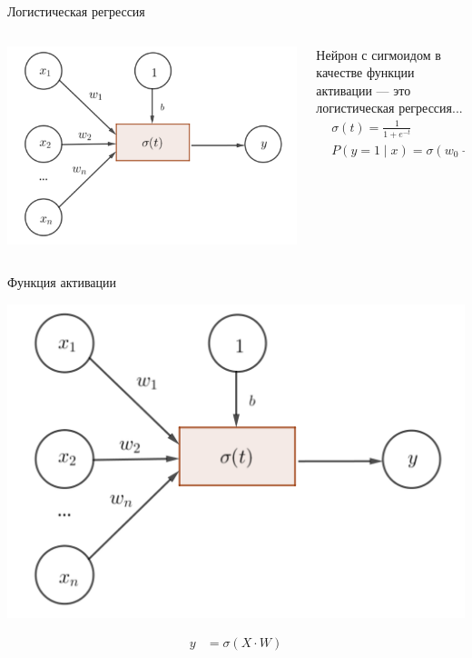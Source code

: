 \documentclass[notes,12pt, aspectratio=169]{beamer}
\begin{document}
\begin{frame}{Логистическая регрессия}
\begin{columns}[T] 
	\begin{column}{.45\textwidth}
		\begin{center}
			\includegraphics[width=0.99\linewidth]{neuron_3.png}
		\end{center}
	\end{column}%
	\hfill%
	\begin{column}{.55\textwidth}
%		
		
		Нейрон с сигмоидом в качестве функции активации — это логистическая регрессия... 
		\begin{equation*}
		\begin{aligned}
		& \sigma(t) = \frac{1}{1 + e^{-t}} \\
		& P(y = 1 \mid x) = \sigma(w_0 + w_1 \cdot x_1 + \ldots + w_n \cdot  x_n) \\
		\end{aligned}
		\end{equation*}
	\end{column}%
\end{columns}
\end{frame}


\begin{frame}{Функция активации}
	\begin{center}
		\includegraphics[width=0.51\linewidth]{neuron_3.png}
	\end{center}
	\begin{equation*}
		\begin{aligned}
		y &= \sigma(X \cdot W) \\ 
		\end{aligned}
	\end{equation*}
\end{frame}
\end{document}
